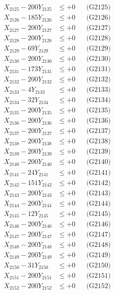 \documentclass[a4paper,10pt]{article}
\begin{document}
{\begin{align}
X_{2125} - 200Y_{2125} &\leq +0 && \text{(G2125)} \\
X_{2126} - 185Y_{2126} &\leq +0 && \text{(G2126)} \\
X_{2127} - 200Y_{2127} &\leq +0 && \text{(G2127)} \\
X_{2128} - 200Y_{2128} &\leq +0 && \text{(G2128)} \\
X_{2129} - 69Y_{2129} &\leq +0 && \text{(G2129)} \\
X_{2130} - 200Y_{2130} &\leq +0 && \text{(G2130)} \\
\allowbreak
X_{2131} - 173Y_{2131} &\leq +0 && \text{(G2131)} \\
X_{2132} - 200Y_{2132} &\leq +0 && \text{(G2132)} \\
X_{2133} - 4Y_{2133} &\leq +0 && \text{(G2133)} \\
X_{2134} - 32Y_{2134} &\leq +0 && \text{(G2134)} \\
X_{2135} - 200Y_{2135} &\leq +0 && \text{(G2135)} \\
X_{2136} - 200Y_{2136} &\leq +0 && \text{(G2136)} \\
X_{2137} - 200Y_{2137} &\leq +0 && \text{(G2137)} \\
X_{2138} - 200Y_{2138} &\leq +0 && \text{(G2138)} \\
X_{2139} - 200Y_{2139} &\leq +0 && \text{(G2139)} \\
X_{2140} - 200Y_{2140} &\leq +0 && \text{(G2140)} \\
\allowbreak
X_{2141} - 24Y_{2141} &\leq +0 && \text{(G2141)} \\
X_{2142} - 151Y_{2142} &\leq +0 && \text{(G2142)} \\
X_{2143} - 200Y_{2143} &\leq +0 && \text{(G2143)} \\
X_{2144} - 200Y_{2144} &\leq +0 && \text{(G2144)} \\
X_{2145} - 12Y_{2145} &\leq +0 && \text{(G2145)} \\
X_{2146} - 200Y_{2146} &\leq +0 && \text{(G2146)} \\
X_{2147} - 200Y_{2147} &\leq +0 && \text{(G2147)} \\
X_{2148} - 200Y_{2148} &\leq +0 && \text{(G2148)} \\
X_{2149} - 200Y_{2149} &\leq +0 && \text{(G2149)} \\
X_{2150} - 31Y_{2150} &\leq +0 && \text{(G2150)} \\
\allowbreak
X_{2151} - 200Y_{2151} &\leq +0 && \text{(G2151)} \\
X_{2152} - 200Y_{2152} &\leq +0 && \text{(G2152)} \\

\end{align}}
\end{document}
